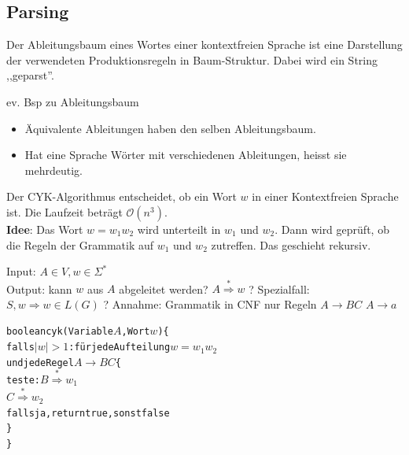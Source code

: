 \documentclass[a4paper]{article}
\begin{document}
\subsection{Parsing}
	\begin{fmerke}
	Der Ableitungsbaum eines Wortes einer kontextfreien Sprache ist eine Darstellung der verwendeten Produktionsregeln in Baum-Struktur. Dabei wird ein String ,,geparst''.
	
	ev. Bsp zu Ableitungsbaum

	\begin{itemize}
		\item Äquivalente Ableitungen haben den selben Ableitungsbaum.
		\item Hat eine Sprache Wörter mit verschiedenen Ableitungen, heisst sie mehrdeutig.
	\end{itemize}
	\end{fmerke}
	
	\begin{falgo}
	\begin{multicols}{2}
	Der CYK-Algorithmus entscheidet, ob ein Wort $w$ in einer Kontextfreien Sprache ist. Die Laufzeit beträgt $\mathcal{O}(n^3)$. \\
	\textbf{Idee}: Das Wort $w=w_1w_2$ wird unterteilt in $w_1$ und $w_2$. Dann wird geprüft, ob die Regeln der Grammatik auf $w_1$ und $w_2$ zutreffen. Das geschieht rekursiv.
	
	Input: $A \in V, w \in \Sigma^*$ \\
	Output: kann $w$ aus $A$ abgeleitet werden? $A \stackrel{*}{\Rightarrow} w$ ?
	Spezialfall: $S, w \Rightarrow w \in L(G)$ ?
	Annahme: Grammatik in CNF
	nur Regeln $A \rightarrow BC$
	$A \rightarrow a$
	
	\columnbreak
	
	\begin{alltt}
boolean cyk(Variable \(A\), Wort \(w\)) \{
  falls \(|w|>1\): für jede Aufteilung \(w=w_1 w_2\) 
              und jede Regel \(A \rightarrow BC\) \{
    teste: \(B \stackrel{*}{\Rightarrow} w_1\)
           \(C \stackrel{*}{\Rightarrow} w_2\)
    falls ja, return true, sonst false
  \}
\}\end{alltt}
	\end{multicols}
	\end{falgo}
\end{document}
